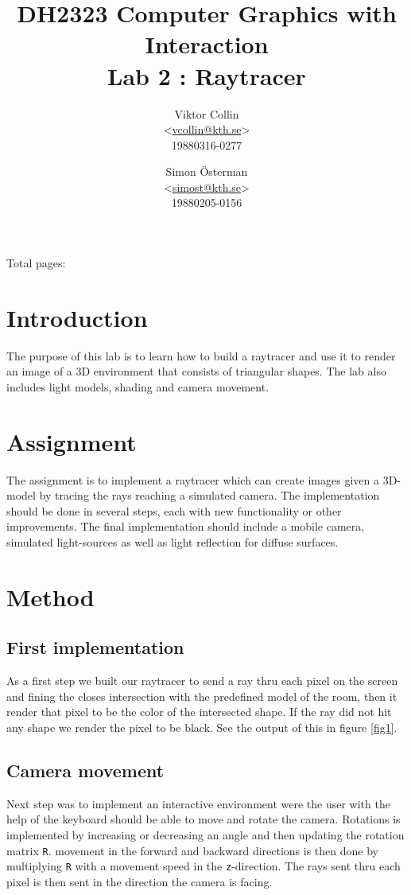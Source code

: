 \documentclass[a4paper,11pt]{article}
\author{Viktor Collin \\ <\url{vcollin@kth.se}> \\ 19880316-0277 \and Simon \"{O}sterman \\ <\url{simost@kth.se}> \\ 19880205-0156}
\title{\textbf{DH2323 Computer Graphics with Interaction \\ Lab 2 : Raytracer}}
\begin{document}
\maketitle
\begin{center}
Total pages: \pageref{LastPage}
\end{center}
\thispagestyle{empty}

\clearpage
\setcounter{page}{1}
\section{Introduction}
The purpose of this lab is to learn how to build a raytracer and use it to render an image of a 3D environment that consists of triangular shapes. The lab also includes light models, shading and camera movement. 
\section{Assignment}
The assignment is to implement a raytracer which can create images given a 3D-model by tracing the rays reaching a simulated camera. The implementation should be done in several steps, each with new functionality or other improvements. The final implementation should include a mobile camera, simulated light-sources as well as light reflection for diffuse surfaces.
\section{Method}
\subsection{First implementation}
As a first step we built our raytracer to send a ray thru each pixel on the screen and fining the closes intersection with the predefined model of the room, then it render that pixel to be the color of the intersected shape. If the ray did not hit any shape we  render the pixel to be black. See the output of this in figure \ref{fig1}.

\subsection{Camera movement}
Next step was to implement an interactive environment were the user with the help of the keyboard should be able to move and rotate the camera. Rotations is implemented by increasing or decreasing an angle and then updating the rotation matrix \verb|R|. movement in the forward and backward directions is then done by multiplying \verb|R| with a movement speed in the \verb|z|-direction. The rays sent thru each pixel is then sent in the direction the camera is facing.
\end{document}
